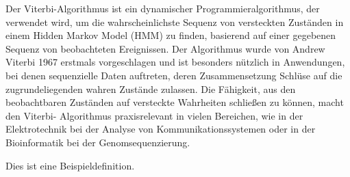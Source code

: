 Der Viterbi-Algorithmus ist ein dynamischer Programmieralgorithmus, der verwendet wird, um die wahrscheinlichste Sequenz von versteckten Zuständen in einem Hidden Markov Model (HMM) zu finden, basierend auf einer gegebenen Sequenz von beobachteten Ereignissen. Der Algorithmus wurde von Andrew Viterbi 1967 erstmals vorgeschlagen und ist besonders nützlich in Anwendungen, bei denen sequenzielle Daten auftreten, deren Zusammensetzung Schlüse auf die zugrundeliegenden wahren Zustände zulassen. Die Fähigkeit, aus den beobachtbaren Zuständen auf versteckte Wahrheiten schließen zu können, macht den Viterbi- Algorithmus praxisrelevant in vielen Bereichen, wie in der Elektrotechnik bei der Analyse von Kommunikationssystemen oder in der Bioinformatik bei der Genomsequenzierung.

\begin{definition}[Beispieldefinition]
Dies ist eine Beispieldefinition.
\end{definition}
